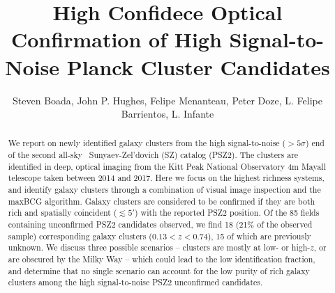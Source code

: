 \documentclass[apj, revtex4-1]{emulateapj}
\begin{document}
\title{High Confidece Optical Confirmation of High Signal-to-Noise Planck Cluster Candidates}

\author{\sc Steven Boada,
John P. Hughes,
Felipe Menanteau,
Peter Doze,
L. Felipe Barrientos,
L. Infante
}



\begin{abstract}
\noindent We report on newly identified galaxy clusters from the high signal-to-noise ($>$$5\sigma$) end of the second all-sky \planck\ Sunyaev-Zel'dovich (SZ) catalog (PSZ2). The clusters are identified in deep, optical imaging from the Kitt Peak National Observatory 4m Mayall telescope taken between 2014 and 2017. Here we focus on the highest richness systems, and identify galaxy clusters through a combination of visual image inspection and the maxBCG algorithm. Galaxy clusters are considered to be confirmed if they are both rich and spatially coincident ($\lesssim 5'$) with the reported PSZ2 position. Of the 85 fields containing unconfirmed PSZ2 candidates observed, we find 18 (21\% of the observed sample) corresponding galaxy clusters ($ 0.13 < z < 0.74$), 15 of which are previously unknown. We discuss three possible scenarios -- clusters are mostly at low- or high-$z$, or are obscured by the Milky Way -- which could lead to the low identification fraction, and determine that no single scenario can account for the low purity of rich galaxy clusters among the high signal-to-noise PSZ2 unconfirmed candidates.
\end{abstract}
\end{document}
